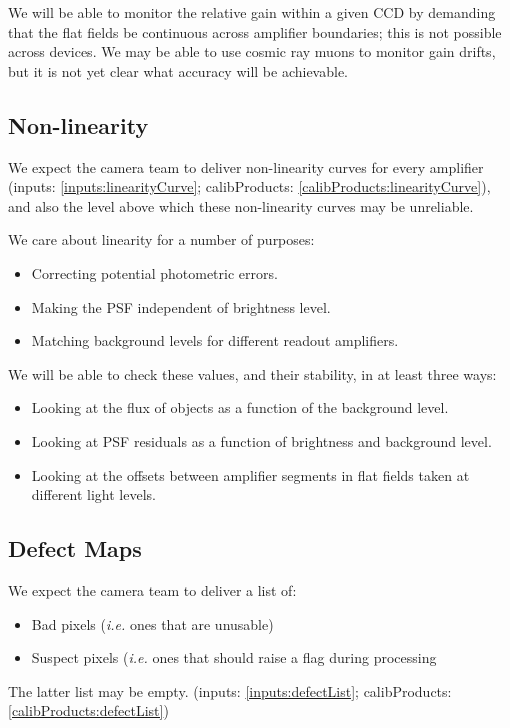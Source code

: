 \documentclass[12pt]{article}
\newcommand{\ie}{\textit{i.e.}\xspace}
\newcommand{\inputOutputData}[1]{(inputs: \ref{inputs:#1}; calibProducts: \ref{calibProducts:#1})}
\begin{document}
We will be able to monitor the relative gain within a given CCD by demanding that the flat fields be
continuous across amplifier boundaries;  this is not possible across devices.  We may be able to use
cosmic ray muons to monitor gain drifts, but it is not yet clear what accuracy will be achievable.

\subsection{Non-linearity}
\label{sec:linearity}

We expect the camera team to deliver non-linearity curves for every amplifier
\inputOutputData{linearityCurve}, and also the level above which these non-linearity curves may be unreliable.

We care about linearity for a number of purposes:
\begin{itemize}
\item Correcting potential photometric errors.
\item Making the PSF independent of brightness level.
\item Matching background levels for different readout amplifiers.
\end{itemize}

We will be able to check these values, and their stability, in at least three ways:
\begin{itemize}
\item Looking at the flux of objects as a function of the background level.
\item Looking at PSF residuals as a function of brightness and background level.
\item Looking at the offsets between amplifier segments in flat fields taken at different light levels.
\end{itemize}

\subsection{Defect Maps}

We expect the camera team to deliver a list of:
\begin{itemize}
\item Bad pixels (\ie ones that are unusable)
\item Suspect pixels (\ie ones that should raise a flag during processing
\end{itemize}
The latter list may be empty.  \inputOutputData{defectList}
\end{document}
